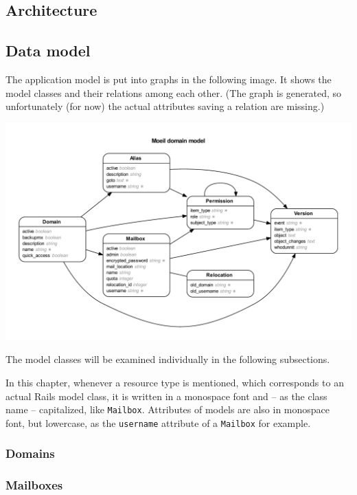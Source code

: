 \documentclass[12pt,a4paper]{scrartcl}
\begin{document}
		\subsection*{Architecture}

		\subsection*{Data model}

			The application model is put into graphs in the following image. It
			shows the model classes and their relations among each other. (The
			graph is generated, so unfortunately (for now) the actual attributes
			saving a relation are missing.)

			\includegraphics[width=\textwidth]{images/erd.pdf}

			The model classes will be examined individually in the following
			subsections.
			\s

			In this chapter, whenever a resource type is mentioned, which
			corresponds to an actual \ac{Rails} model class, it is written in a
			monospace font and -- as the class name -- capitalized, like
			\texttt{Mailbox}. Attributes of models are also in monospace font,
			but lowercase, as the \texttt{username} attribute of a
			\texttt{Mailbox} for example.

			\subsubsection*{Domains}

			\subsubsection*{Mailboxes}
\end{document}
